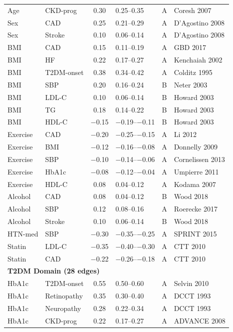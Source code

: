 \documentclass[runningheads]{llncs}
\begin{document}
{\begin{longtable}{@{}p{2.0cm}p{2.0cm}cp{1.4cm}cp{2.8cm}@{}}
Age & CKD-prog & 0.30 & 0.25--0.35 & A & Coresh 2007 \\
Sex & CAD & 0.25 & 0.21--0.29 & A & D'Agostino 2008 \\
Sex & Stroke & 0.10 & 0.06--0.14 & A & D'Agostino 2008 \\
BMI & CAD & 0.15 & 0.11--0.19 & A & GBD 2017 \\
BMI & HF & 0.22 & 0.17--0.27 & A & Kenchaiah 2002 \\
BMI & T2DM-onset & 0.38 & 0.34--0.42 & A & Colditz 1995 \\
BMI & SBP & 0.20 & 0.16--0.24 & B & Neter 2003 \\
BMI & LDL-C & 0.10 & 0.06--0.14 & B & Howard 2003 \\
BMI & TG & 0.18 & 0.14--0.22 & B & Howard 2003 \\
BMI & HDL-C & $-$0.15 & $-$0.19--$-$0.11 & B & Howard 2003 \\
Exercise & CAD & $-$0.20 & $-$0.25--$-$0.15 & A & Li 2012 \\
Exercise & BMI & $-$0.12 & $-$0.16--$-$0.08 & A & Donnelly 2009 \\
Exercise & SBP & $-$0.10 & $-$0.14--$-$0.06 & A & Cornelissen 2013 \\
Exercise & HbA1c & $-$0.08 & $-$0.12--$-$0.04 & A & Umpierre 2011 \\
Exercise & HDL-C & 0.08 & 0.04--0.12 & A & Kodama 2007 \\
Alcohol & CAD & 0.08 & 0.04--0.12 & B & Wood 2018 \\
Alcohol & SBP & 0.12 & 0.08--0.16 & A & Roerecke 2017 \\
Alcohol & Stroke & 0.10 & 0.06--0.14 & B & Wood 2018 \\
HTN-med & SBP & $-$0.30 & $-$0.35--$-$0.25 & A & SPRINT 2015 \\
Statin & LDL-C & $-$0.35 & $-$0.40--$-$0.30 & A & CTT 2010 \\
Statin & CAD & $-$0.22 & $-$0.26--$-$0.18 & A & CTT 2010 \\
\midrule
\multicolumn{6}{l}{\textbf{T2DM Domain (28 edges)}} \\
\midrule
HbA1c & T2DM-onset & 0.55 & 0.50--0.60 & A & Selvin 2010 \\
HbA1c & Retinopathy & 0.35 & 0.30--0.40 & A & DCCT 1993 \\
HbA1c & Neuropathy & 0.28 & 0.22--0.34 & A & DCCT 1993 \\
HbA1c & CKD-prog & 0.22 & 0.17--0.27 & A & ADVANCE 2008 \\

\end{longtable}}
\end{document}
